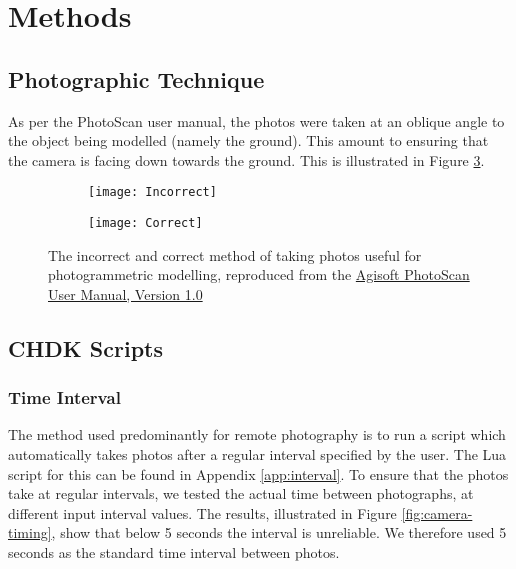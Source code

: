 \section{Methods}

\subsection{Photographic Technique}

As per the PhotoScan user
manual, the
photos were taken at an oblique angle to the object being modelled (namely the
ground). This amount to ensuring that the camera is facing down towards the
ground. This is illustrated in Figure \ref{img:photographic-method}.

\begin{figure}[H]
    \centering
    \begin{subfigure}[b]{0.49\textwidth}
        \texttt{[image: Incorrect]}
        \label{img:incorrect}
    \end{subfigure}
    \begin{subfigure}[b]{0.49\textwidth}
        \texttt{[image: Correct]}
        \label{img:correct}
    \end{subfigure}
    \caption{The incorrect and correct method of taking photos useful for
        photogrammetric modelling, reproduced from the
        \href{http://downloads.agisoft.ru/pdf/photoscan-pro\_1\_0\_0\_en.pdf}{Agisoft
        PhotoScan User Manual, Version 1.0}}
    \label{img:photographic-method}
\end{figure}

\subsection{CHDK Scripts}

\subsubsection{Time Interval}

The method used predominantly for remote photography is to run a script which
automatically takes photos after a regular interval specified by the user. The
Lua script for this can be found in Appendix \ref{app:interval}. To ensure that
the photos take at regular intervals, we tested the actual time between
photographs, at different input interval values. The results, illustrated in
Figure \ref{fig:camera-timing}, show that below 5 seconds the interval is
unreliable. We therefore used 5 seconds as the standard time interval between
photos.


